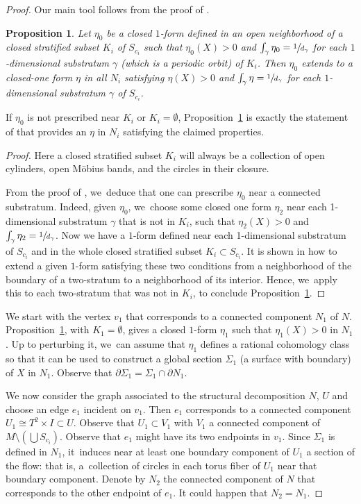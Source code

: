 \documentclass[10pt]{amsart}
\newtheorem{prop}[theorem]{Proposition}
\theoremstyle{definition}
\begin{document}
\begin{proof}
Our main tool follows from the proof of \cite[Prop.\,2.8]{CV2}.

\begin{prop}\label{prop:CV2}
Let $\eta_0$ be a closed $1$-form defined in an open neighborhood of a closed stratified subset $K_i$ of $S_{c_i}$ such that $\eta_0(X)>0$ and $\int_{\gamma}\eta_0=\sfrac{1}{d_{\gamma}}$ for each $1$-dimensional substratum $\gamma$ (which is a periodic orbit) of $K_i$. Then $\eta_0$ extends to a closed-one form $\eta$ in all $N_i$ satisfying $\eta(X)>0$ and $\int_{\gamma} \eta=\sfrac{1}{d_{\gamma}}$ for each $1$-dimensional substratum $\gamma$ of $S_{c_i}$.
\end{prop}

If $\eta_0$ is not prescribed near $K_i$ or $K_i=\emptyset$, Proposition~\ref{prop:CV2} is exactly the statement of \cite[Prop.\,2.8]{CV2} that provides an $\eta$ in $N_i$ satisfying the claimed properties.

\begin{proof}
Here a closed stratified subset $K_i$ will always be a collection of open cylinders, open Möbius bands, and the circles in their closure.\enlargethispage{.5\baselineskip}%

From the proof of \cite[Prop.\,2.8]{CV2}, we~deduce that one can prescribe $\eta_0$ near a connected substratum. Indeed, given $\eta_0$, we~choose some closed one form $\eta_2$ near each 1-dimensional substratum $\gamma$ that is not in $K_i$, such that $\eta_2(X)>0$ and $\int_{\gamma}\eta_2=\sfrac{1}{d_{\gamma}}$. Now we have a $1$-form defined near each 1-dimensional substratum of $S_{c_i}$ and in the whole closed stratified subset $K_i\subset S_{c_i}$. It is shown in \cite[\S 2, p.\,463--464]{CV2} how to extend a given $1$-form satisfying these two conditions from a neighborhood of the boundary of a two-stratum to a neighborhood of its interior. Hence, we~apply this to each two-stratum that was not in $K_i$, to conclude Proposition~\ref{prop:CV2}.
\end{proof}

We start with the vertex $v_1$ that corresponds to a connected component $N_1$ of $N$. Proposition~\ref{prop:CV2}, with $K_1=\emptyset$, gives a closed $1$-form $\eta_1$ such that $\eta_1(X)>0$ in $N_1$. Up to perturbing it, we~can assume that $\eta_1$ defines a rational cohomology class so that it can be used to construct a global section $\Sigma_1$ (a surface with boundary) of $X$ in $N_1$. Observe that $\partial\Sigma_1=\Sigma_1\cap \partial N_1$.

We now consider the graph associated to the structural decomposition $N$, $U$ and choose an edge $e_1$ incident on $v_1$. Then $e_1$ corresponds to a connected component $U_1\cong T^2\times I\subset U$. Observe that $U_1\subset V_1$ with $V_1$ a connected component of $M\setminus \left( \bigcup S_{c_i} \right)$. Observe that $e_1$ might have its two endpoints in $v_1$. Since $\Sigma_1$ is defined in $N_1$, it~induces near at least one boundary component of $U_1$ a section of the flow: that is, a~collection of circles in each torus fiber of $U_1$ near that boundary component. Denote by $N_2$ the connected component of $N$ that corresponds to the other endpoint of $e_1$. It could happen that $N_2=N_1$.


\end{proof}
\end{document}
